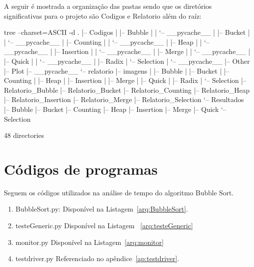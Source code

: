 \documentclass[12pt,a4paper,twoside]{report}
\begin{document}
A seguir é mostrada a organização das pastas sendo que os diretórios significativas para o projeto são Codigos e Relatorio além do raíz:
\begin{terminal}
 tree --charset=ASCII -d
.
|-- Codigos
|   |-- Bubble
|   |   `-- __pycache__
|   |-- Bucket
|   |   `-- __pycache__
|   |-- Counting
|   |   `-- __pycache__
|   |-- Heap
|   |   `-- __pycache__
|   |-- Insertion
|   |   `-- __pycache__
|   |-- Merge
|   |   `-- __pycache__
|   |-- Quick
|   |   `-- __pycache__
|   |-- Radix
|   `-- Selection
|       `-- __pycache__
|-- Other
|-- Plot
|-- __pycache__
`-- relatorio
    |-- imagens
    |   |-- Bubble
    |   |-- Bucket
    |   |-- Counting
    |   |-- Heap
    |   |-- Insertion
    |   |-- Merge
    |   |-- Quick
    |   |-- Radix
    |   `-- Selection
    |-- Relatorio_Bubble
    |-- Relatorio_Bucket
    |-- Relatorio_Counting
    |-- Relatorio_Heap
    |-- Relatorio_Insertion
    |-- Relatorio_Merge
    |-- Relatorio_Selection
    `-- Resultados
        |-- Bubble
        |-- Bucket
        |-- Counting
        |-- Heap
        |-- Insertion
        |-- Merge
        |-- Quick
        `-- Selection

48 directories


\end{terminal}

\section{Códigos de programas}
Seguem os códigos utilizados na análise de tempo do algoritmo Bubble Sort.
\begin{enumerate}

\item BubbleSort.py:
Disponível na Listagem~\ref{arq:BubbleSort}.


\item testeGeneric.py
Disponível na Listagem ~\ref{arq:testeGeneric}


\item monitor.py
Disponível na Listagem~\ref{arq:monitor}



\item testdriver.py
 Referenciado no apêndice~\ref{ap:testdriver}.
\end{enumerate}
\end{document}
